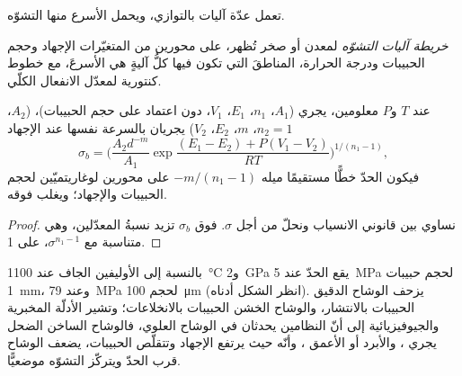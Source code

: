 تعمل عدّة آليات بالتوازي، ويحمل الأسرع منها التشوّه.

\begin{definition}\label{def:b3:deformation-mechanisms:deformation-map}
\emph{خريطة آليات التشوّه} لمعدن أو صخر
تُظهر، على محورين من المتغيّرات الإجهاد وحجم الحبيبات ودرجة الحرارة،
المناطقَ التي تكون فيها كلُّ آليةٍ هي الأسرعَ، مع خطوط كنتورية
لمعدّل الانفعال الكلّي.
\end{definition}

\begin{proposition}[حدّ الآليات]\label{prop:b3:deformation-mechanisms:boundary}
عند $T$ و$P$ معلومين، يجري  ($A_1$، $n_1$، $E_1$، $V_1$، دون
اعتماد على حجم الحبيبات)،  ($A_2$، $n_2 = 1$، $m$، $E_2$، $V_2$)
يجريان بالسرعة نفسها عند الإجهاد
\[
  \sigma_b = \biggl(\frac{A_2d^{-m}}{A_1}
  \exp\frac{(E_1 - E_2) + P(V_1 - V_2)}{RT}\biggr)^{1/(n_1 - 1)} ,
\]
فيكون الحدّ خطًّا مستقيمًا ميله $-m/(n_1 - 1)$ على محورين لوغاريتميّين
لحجم الحبيبات والإجهاد؛ ويغلب  فوقه.
\end{proposition}

\begin{proof}
نساوي بين قانوني الانسياب ونحلّ من أجل $\sigma$. فوق $\sigma_b$ تزيد نسبةُ
المعدّلين، وهي متناسبة مع $\sigma^{n_1 - 1}$، على 1.
\end{proof}

بالنسبة إلى الأوليفين الجاف عند \qty{1100}{\celsius} و\qty{2}{GPa} يقع الحدّ عند
\qty{5}{MPa} لحجم حبيبات \qty{1}{mm}، وعند \qty{79}{MPa} لحجم
\qty{100}{\micro m} (انظر الشكل أدناه). يزحف الوشاح الدقيق الحبيبات بالانتشار،
والوشاح الخشن الحبيبات بالانخلاعات؛ وتشير الأدلّة المخبرية والجيوفيزيائية
إلى أنّ النظامين يحدثان في الوشاح العلوي، فالوشاح الساخن الضحل يجري
، والأبرد أو الأعمق ، وأنّه حيث
يرتفع الإجهاد وتتقلّص الحبيبات، يضعف الوشاح قرب الحدّ
ويتركّز التشوّه موضعيًّا.

